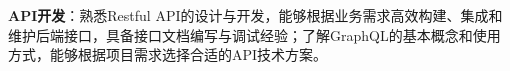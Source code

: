 \item \textbf{API开发}：熟悉Restful API的设计与开发，能够根据业务需求高效构建、集成和维护后端接口，具备接口文档编写与调试经验；了解GraphQL的基本概念和使用方式，能够根据项目需求选择合适的API技术方案。
